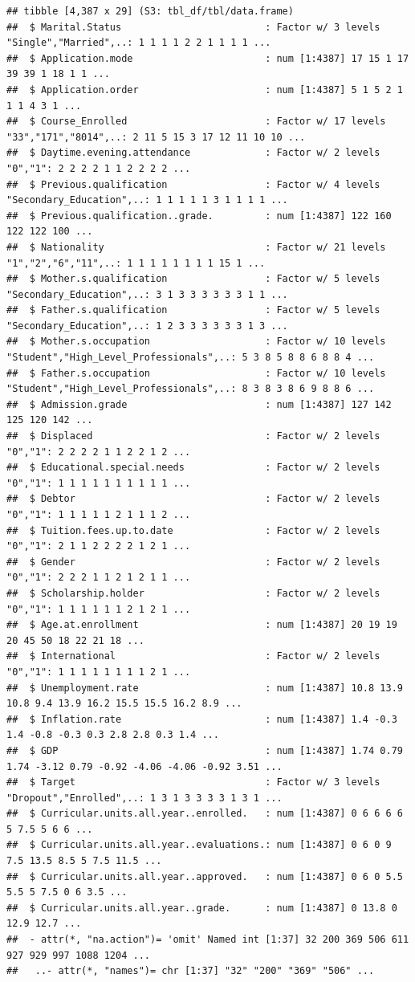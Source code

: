 \documentclass[
]{article}
\begin{document}
\begin{verbatim}
## tibble [4,387 x 29] (S3: tbl_df/tbl/data.frame)
##  $ Marital.Status                         : Factor w/ 3 levels "Single","Married",..: 1 1 1 1 2 2 1 1 1 1 ...
##  $ Application.mode                       : num [1:4387] 17 15 1 17 39 39 1 18 1 1 ...
##  $ Application.order                      : num [1:4387] 5 1 5 2 1 1 1 4 3 1 ...
##  $ Course_Enrolled                        : Factor w/ 17 levels "33","171","8014",..: 2 11 5 15 3 17 12 11 10 10 ...
##  $ Daytime.evening.attendance             : Factor w/ 2 levels "0","1": 2 2 2 2 1 1 2 2 2 2 ...
##  $ Previous.qualification                 : Factor w/ 4 levels "Secondary_Education",..: 1 1 1 1 1 3 1 1 1 1 ...
##  $ Previous.qualification..grade.         : num [1:4387] 122 160 122 122 100 ...
##  $ Nationality                            : Factor w/ 21 levels "1","2","6","11",..: 1 1 1 1 1 1 1 1 15 1 ...
##  $ Mother.s.qualification                 : Factor w/ 5 levels "Secondary_Education",..: 3 1 3 3 3 3 3 3 1 1 ...
##  $ Father.s.qualification                 : Factor w/ 5 levels "Secondary_Education",..: 1 2 3 3 3 3 3 3 1 3 ...
##  $ Mother.s.occupation                    : Factor w/ 10 levels "Student","High_Level_Professionals",..: 5 3 8 5 8 8 6 8 8 4 ...
##  $ Father.s.occupation                    : Factor w/ 10 levels "Student","High_Level_Professionals",..: 8 3 8 3 8 6 9 8 8 6 ...
##  $ Admission.grade                        : num [1:4387] 127 142 125 120 142 ...
##  $ Displaced                              : Factor w/ 2 levels "0","1": 2 2 2 2 1 1 2 2 1 2 ...
##  $ Educational.special.needs              : Factor w/ 2 levels "0","1": 1 1 1 1 1 1 1 1 1 1 ...
##  $ Debtor                                 : Factor w/ 2 levels "0","1": 1 1 1 1 1 2 1 1 1 2 ...
##  $ Tuition.fees.up.to.date                : Factor w/ 2 levels "0","1": 2 1 1 2 2 2 2 1 2 1 ...
##  $ Gender                                 : Factor w/ 2 levels "0","1": 2 2 2 1 1 2 1 2 1 1 ...
##  $ Scholarship.holder                     : Factor w/ 2 levels "0","1": 1 1 1 1 1 1 2 1 2 1 ...
##  $ Age.at.enrollment                      : num [1:4387] 20 19 19 20 45 50 18 22 21 18 ...
##  $ International                          : Factor w/ 2 levels "0","1": 1 1 1 1 1 1 1 1 2 1 ...
##  $ Unemployment.rate                      : num [1:4387] 10.8 13.9 10.8 9.4 13.9 16.2 15.5 15.5 16.2 8.9 ...
##  $ Inflation.rate                         : num [1:4387] 1.4 -0.3 1.4 -0.8 -0.3 0.3 2.8 2.8 0.3 1.4 ...
##  $ GDP                                    : num [1:4387] 1.74 0.79 1.74 -3.12 0.79 -0.92 -4.06 -4.06 -0.92 3.51 ...
##  $ Target                                 : Factor w/ 3 levels "Dropout","Enrolled",..: 1 3 1 3 3 3 3 1 3 1 ...
##  $ Curricular.units.all.year..enrolled.   : num [1:4387] 0 6 6 6 6 5 7.5 5 6 6 ...
##  $ Curricular.units.all.year..evaluations.: num [1:4387] 0 6 0 9 7.5 13.5 8.5 5 7.5 11.5 ...
##  $ Curricular.units.all.year..approved.   : num [1:4387] 0 6 0 5.5 5.5 5 7.5 0 6 3.5 ...
##  $ Curricular.units.all.year..grade.      : num [1:4387] 0 13.8 0 12.9 12.7 ...
##  - attr(*, "na.action")= 'omit' Named int [1:37] 32 200 369 506 611 927 929 997 1088 1204 ...
##   ..- attr(*, "names")= chr [1:37] "32" "200" "369" "506" ...
\end{verbatim}
\end{document}
